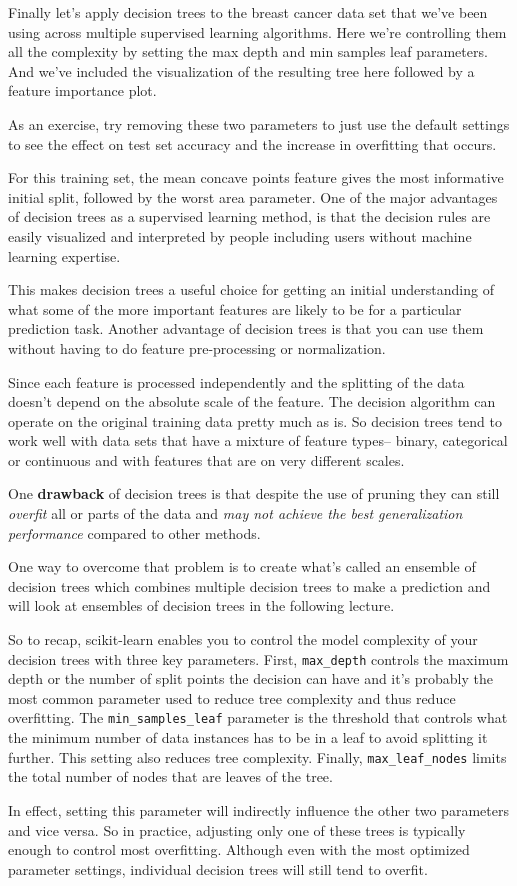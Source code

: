 \begin{multicols}{2}
Finally let's apply decision trees to the breast cancer data set that we've been using across multiple supervised learning algorithms. Here we're controlling them all the complexity by setting the max depth and min samples leaf parameters. And we've included the visualization of the resulting tree here followed by a feature importance plot. 

As an exercise, try removing these two parameters to just use the default settings to see the effect on test set accuracy and the increase in overfitting that occurs. 

For this training set, the mean concave points feature gives the most informative initial split, followed by the worst area parameter. One of the major advantages of decision trees as a supervised learning method, is that the decision rules are easily visualized and interpreted by people including users without machine learning expertise. 

This makes decision trees a useful choice for getting an initial understanding of what some of the more important features are likely to be for a particular prediction task. Another advantage of decision trees is that you can use them without having to do feature pre-processing or normalization. 

Since each feature is processed independently and the splitting of the data doesn't depend on the absolute scale of the feature. The decision algorithm can operate on the original training data pretty much as is. So decision trees tend to work well with data sets that have a mixture of feature types-- binary, categorical or continuous and with features that are on very different scales. 

One \textbf{drawback} of decision trees is that despite the use of pruning they can still \emph{overfit} all or parts of the data and \emph{may not achieve the best generalization performance} compared to other methods. 

One way to overcome that problem is to create what's called an ensemble of decision trees which combines multiple decision trees to make a prediction and will look at ensembles of decision trees in the following lecture. 

So to recap, scikit-learn enables you to control the model complexity of your decision trees with three key parameters. First, \texttt{max_depth} controls the maximum depth or the number of split points the decision can have and it's probably the most common parameter used to reduce tree complexity and thus reduce overfitting. The \texttt{min_samples_leaf}  parameter is the threshold that controls what the minimum number of data instances has to be in a leaf to avoid splitting it further. This setting also reduces tree complexity. Finally, \texttt{max_leaf_nodes} limits the total number of nodes that are leaves of the tree. 

In effect, setting this parameter will indirectly influence the other two parameters and vice versa. So in practice, adjusting only one of these trees is typically enough to control most overfitting. Although even with the most optimized parameter settings, individual decision trees will still tend to overfit. 
\end{multicols}